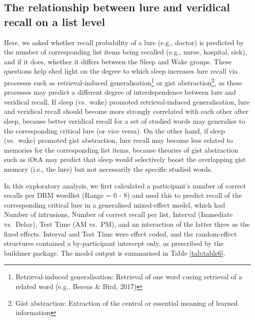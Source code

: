 \documentclass[
]{article}
\begin{document}
\hypertarget{the-relationship-between-lure-and-veridical-recall-on-a-list-level}{%
\subsection{The relationship between lure and veridical recall on a list level}\label{the-relationship-between-lure-and-veridical-recall-on-a-list-level}}

Here, we asked whether recall probability of a lure (e.g., doctor) is predicted by the number of corresponding list items being recalled (e.g., nurse, hospital, sick), and if it does, whether it differs between the Sleep and Wake groups. These questions help shed light on the degree to which sleep increases lure recall via processes such as retrieval-induced generalisation\footnote{Retrieval-induced generalisation: Retrieval of one word cueing retrieval of a related word (e.g., Berens \& Bird, 2017)} or gist abstraction\footnote{Gist abstraction: Extraction of the central or essential meaning of learned information}, as these processes may predict a different degree of interdependence between lure and veridical recall. If sleep (vs.~wake) promoted retrieval-induced generalisation, lure and veridical recall should become more strongly correlated with each other after sleep, because better veridical recall for a set of studied words may generalise to the corresponding critical lure (or vice versa). On the other hand, if sleep (vs.~wake) promoted gist abstraction, lure recall may become less related to memories for the corresponding list items, because theories of gist abstraction such as iOtA may predict that sleep would selectively boost the overlapping gist memory (i.e., the lure) but not necessarily the specific studied words.

In this exploratory analysis, we first calculated a participant's number of correct recalls per DRM wordlist (Range = 0 - 8) and used this to predict recall of the corresponding critical lure in a generalised mixed-effect model, which had Number of intrusions, Number of correct recall per list, Interval (Immediate vs.~Delay), Test Time (AM vs.~PM), and an interaction of the latter three as the fixed effects. Interval and Test Time were effect coded, and the random-effect structures contained a by-participant intercept only, as prescribed by the buildmer package. The model output is summarised in Table \ref{tab:table6}.
\end{document}
